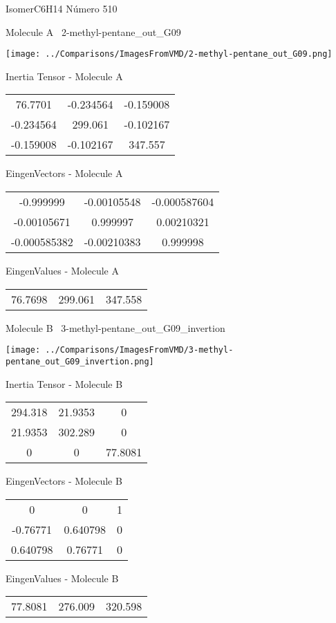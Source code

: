 \vtab[-3cm]
\begin{center}
{\large IsomerC6H14 \tab Número 510}
\end{center}
\begin{multicols}{2}
\begin{center}

Molecule A \
2-methyl-pentane\_out\_G09

\texttt{[image: ../Comparisons/ImagesFromVMD/2-methyl-pentane\_out\_G09.png]}

Inertia Tensor - Molecule A \\
\begin{tabular}{|c c c|}
76.7701	 & 	-0.234564	 & 	-0.159008	 \\
-0.234564	 & 	299.061	 & 	-0.102167	 \\
-0.159008	 & 	-0.102167	 & 	347.557
\end{tabular}

\vtab
 EingenVectors - Molecule A     \\
\begin{tabular}{|c c c|}
-0.999999	 & 	-0.00105548	 & 	-0.000587604	 \\
-0.00105671	 & 	0.999997	 & 	0.00210321	 \\
-0.000585382	 & 	-0.00210383	 & 	0.999998
\end{tabular}

\vtab
 EingenValues - Molecule A     \\
\begin{tabular}{|c c c|}
76.7698	 & 	299.061	 & 	347.558	 \\
\end{tabular}
\columnbreak

Molecule B \
3-methyl-pentane\_out\_G09\_invertion

\texttt{[image: ../Comparisons/ImagesFromVMD/3-methyl-pentane\_out\_G09\_invertion.png]}

Inertia Tensor - Molecule B \\
\begin{tabular}{|c c c|}
294.318	 & 	21.9353	 & 	0	 \\
21.9353	 & 	302.289	 & 	0	 \\
0	 & 	0	 & 	77.8081
\end{tabular}

\vtab
 EingenVectors - Molecule B     \\
\begin{tabular}{|c c c|}
0	 & 	0	 & 	1	 \\
-0.76771	 & 	0.640798	 & 	0	 \\
0.640798	 & 	0.76771	 & 	0
\end{tabular}

\vtab
 EingenValues - Molecule B     \\
\begin{tabular}{|c c c|}
77.8081	 & 	276.009	 & 	320.598	 \\
\end{tabular}

\end{center}
\end{multicols}


